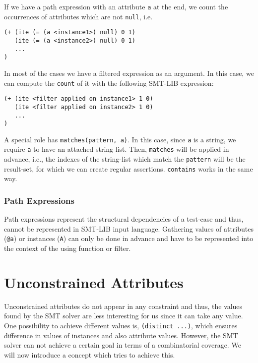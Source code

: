 If we have a path expression with an attribute \verb|a| at the end, we count the occurrences of attributes which are not \verb|null|, i.e.

\begin{verbatim}
(+ (ite (= (a <instance1>) null) 0 1)
   (ite (= (a <instance2>) null) 0 1)
   ...
)
\end{verbatim}

In most of the cases we have a filtered expression as an argument. In this case, we can compute the \verb|count| of it with the following SMT-LIB expression:
\begin{verbatim}
(+ (ite <filter applied on instance1> 1 0)
   (ite <filter applied on instance2> 1 0)
   ...
)
\end{verbatim}

A special role has \verb|matches(pattern, a)|. In this case, since \verb|a| is a string, we require \verb|a| to have an attached string-list. Then, \verb|matches| will be applied in advance, i.e., the indexes of the string-list which match the \verb|pattern| will be the result-set, for which we can create regular assertions. \verb|contains| works in the same way.

\subsubsection*{Path Expressions}

Path expressions represent the structural dependencies of a test-case and thus, cannot be represented in SMT-LIB input language. Gathering values of attributes (\verb|@a|) or instances (\verb|A|) can only be done in advance and have to be represented into the context of the using function or filter.





\section{Unconstrained Attributes}\label{sec:nonconstraint}

Unconstrained attributes do not appear in any constraint and thus, the values found by the SMT solver are less interesting for us since it can take any value. One possibility to achieve different values is, \verb|(distinct ...)|, which ensures difference in values of instances and also attribute values. However, the SMT solver can not achieve a certain goal in terms of a combinatorial coverage. We will now introduce a concept which tries to achieve this.


